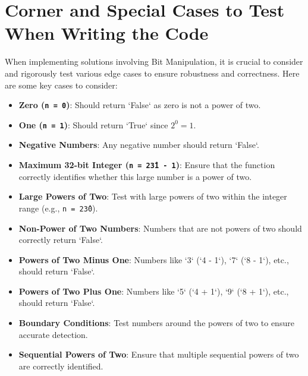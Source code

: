 \section*{Corner and Special Cases to Test When Writing the Code}

When implementing solutions involving Bit Manipulation, it is crucial to consider and rigorously test various edge cases to ensure robustness and correctness. Here are some key cases to consider:

\begin{itemize}
    \item \textbf{Zero (\texttt{n = 0})}: Should return `False` as zero is not a power of two.
    
    \item \textbf{One (\texttt{n = 1})}: Should return `True` since \(2^0 = 1\).
    
    \item \textbf{Negative Numbers}: Any negative number should return `False`.
    
    \item \textbf{Maximum 32-bit Integer (\texttt{n = 2\^{31} - 1})}: Ensure that the function correctly identifies whether this large number is a power of two.
    
    \item \textbf{Large Powers of Two}: Test with large powers of two within the integer range (e.g., \texttt{n = 2\^{30}}).
    
    \item \textbf{Non-Power of Two Numbers}: Numbers that are not powers of two should correctly return `False`.
    
    \item \textbf{Powers of Two Minus One}: Numbers like `3` (`4 - 1`), `7` (`8 - 1`), etc., should return `False`.
    
    \item \textbf{Powers of Two Plus One}: Numbers like `5` (`4 + 1`), `9` (`8 + 1`), etc., should return `False`.
    
    \item \textbf{Boundary Conditions}: Test numbers around the powers of two to ensure accurate detection.
    
    \item \textbf{Sequential Powers of Two}: Ensure that multiple sequential powers of two are correctly identified.
\end{itemize}

